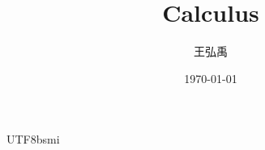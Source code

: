 \documentclass[12pt, a4paper]{article}
\title{\textbf{Calculus}}
\author{王弘禹}
\date\today
\begin{document}
\begin{CJK*}{UTF8}{bsmi}
\linespread{1.5}
\maketitle
\newcommand{\st}[1]{\section*{#1}}
\newcommand{\sst}[1]{\subsection*{#1}}
\newcommand{\ssst}[1]{\subsubsection*{#1}}
\newcommand{\dsp}{\displaystyle}
\newcommand{\dx}{\,dx}
\newcommand{\dphi}{\,d\phi}
\newcommand{\dtheta}{\,d\theta}
\newcommand{\dy}{\,dy}
\newcommand{\dz}{\,dz}
\newcommand{\dr}{\,dr}
\newcommand{\drho}{\,d\rho}
\newcommand{\tb}{\textbf}

\end{CJK*}
\end{document}
